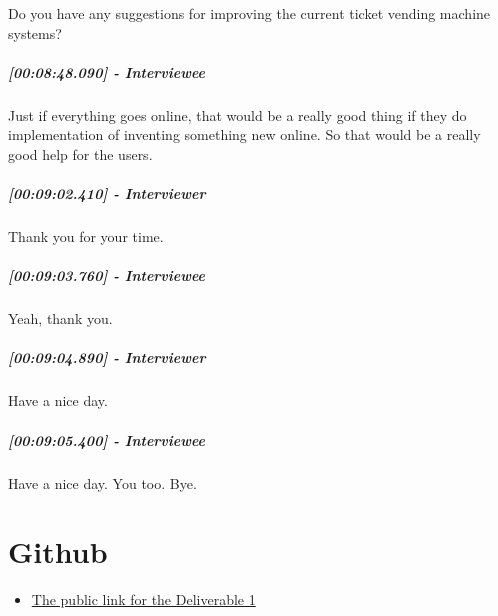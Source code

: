 \documentclass[a4paper,12pt]{article}
\begin{document}
Do you have any suggestions for improving the current ticket vending
machine systems?

\hypertarget{interviewee-30}{%
\subparagraph{{[}00:08:48.090{]} - Interviewee}\label{interviewee-30}}

Just if everything goes online, that would be a really good thing if
they do implementation of inventing something new online. So that would
be a really good help for the users.

\hypertarget{interviewer-39}{%
\subparagraph{{[}00:09:02.410{]} - Interviewer}\label{interviewer-39}}

Thank you for your time.

\hypertarget{interviewee-31}{%
\subparagraph{{[}00:09:03.760{]} - Interviewee}\label{interviewee-31}}

Yeah, thank you.

\hypertarget{interviewer-40}{%
\subparagraph{{[}00:09:04.890{]} - Interviewer}\label{interviewer-40}}

Have a nice day.

\hypertarget{interviewee-32}{%
\subparagraph{{[}00:09:05.400{]} - Interviewee}\label{interviewee-32}}

Have a nice day. You too. Bye.

\section{Github}
\begin{itemize}
\item
\href{https://github.com/singlapiyush1/SDM-Project}{The public link for the Deliverable 1}
\end{itemize}
\end{document}
